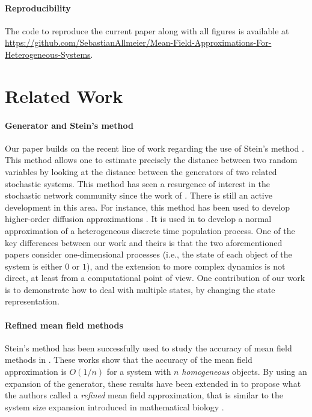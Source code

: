 \documentclass[acmsmall]{acmart}
\begin{document}
\color{neworange}
\paragraph*{Reproducibility}
The code to reproduce the current paper along with all figures is available at \url{https://github.com/SebastianAllmeier/Mean-Field-Approximations-For-Heterogeneous-Systems}.
\color{black}



\section{Related Work}
\label{sec:related_work}

\paragraph*{Generator and Stein's method}
Our paper builds on the recent line of work regarding the use of Stein's method \cite{stein1986approximate}. This method allows one to estimate precisely the distance between two random variables by looking at the distance between the generators of two related stochastic systems. This method has seen a resurgence of interest in the stochastic network community since the work of \cite{braverman2017stein,braverman2017stein2}. There is still an active development in this area. For instance, this method has been used to develop higher-order diffusion approximations \cite{bravermanHighOrderSteadystate2020,bravermanSteinMethodSteadystate2017a}. It is used in \cite{hodgkinsonNormalApproximationsDiscretetime2018} to develop a normal approximation of a heterogeneous discrete time population process. One of the key differences between our work and theirs is that the two aforementioned papers consider one-dimensional processes (i.e., the state of each object of the system is either $0$ or $1$), and the extension to more complex dynamics is not direct, at least from a computational point of view. One contribution of our work is to demonstrate how to deal with multiple states, by changing the state representation. 

\paragraph*{Refined mean field methods} Stein's method has been successfully used to study the accuracy of mean field methods in \cite{gast2017expected,kolokoltsovMeanFieldGames2012,ying2016rate,ying2017stein}. These works show that the accuracy of the mean field approximation is $O(1/n)$ for a system with $n$ \emph{homogeneous} objects. By using an expansion of the generator, these results have been extended in \cite{gastSizeExpansionsMean2019,gastRefinedMeanField2017} to propose what the authors called a \emph{refined} mean field approximation, that is similar to the system size expansion introduced in mathematical biology \cite{vankampen2007,grima2010effective,grima2011}. 
\end{document}
